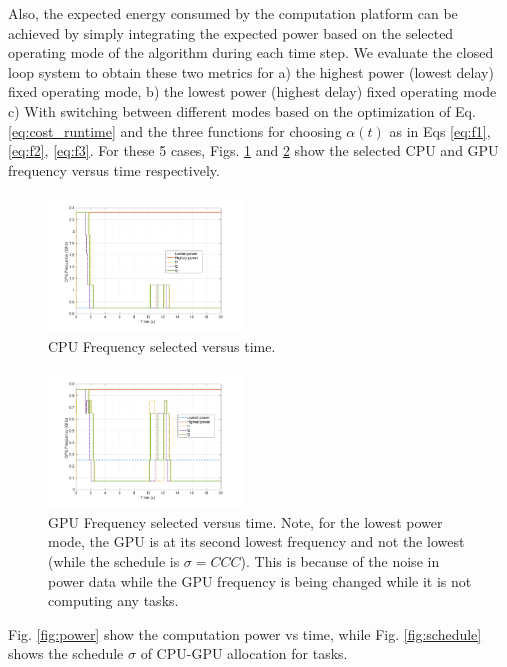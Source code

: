 Also, the expected energy consumed by the computation platform can be achieved by simply integrating the expected power based on the selected operating mode of the algorithm during each time step. We evaluate the closed loop system to obtain these two metrics for a) the highest power (lowest delay) fixed operating mode, b) the lowest power (highest delay) fixed operating mode c) With switching between different modes based on the optimization of Eq.\ref{eq:cost_runtime} and the three functions for choosing $\alpha(t)$ as in Eqs \ref{eq:f1}, \ref{eq:f2}, \ref{eq:f3}. For these 5 cases, Figs. \ref{fig:cpuf} and \ref{fig:gpuf} show the selected CPU and GPU frequency versus time respectively.  
\begin{figure}[hbtp]
\centering
\includegraphics[width=0.46\textwidth]{../simulations/figs/CPUF.pdf}
\caption{CPU Frequency selected versus time.}
\label{fig:cpuf} 
\end{figure}


\begin{figure}[hbtp]
\centering
\includegraphics[width=0.46\textwidth]{../simulations/figs/GPUF.pdf}
\caption{GPU Frequency selected versus time. Note, for the lowest power mode, the GPU is at its second lowest frequency and not the lowest (while the schedule is $\sigma=CCC$). This is because of the noise in power data while the GPU frequency is being changed while it is not computing any tasks.}
\label{fig:gpuf} 
\end{figure}

Fig. \ref{fig:power} show the computation power vs time, while Fig. \ref{fig:schedule} shows the schedule $\sigma$ of CPU-GPU allocation for tasks.

